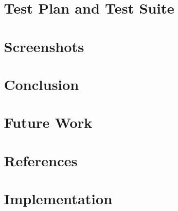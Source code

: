 \documentclass[13pt,letterpaper]{article}
\begin{document}
\section{Test Plan and Test Suite}

\section{Screenshots}

\section{Conclusion}

\section{Future Work}

\section{References}

\appendix
\section{Implementation}

% 
\end{document}
